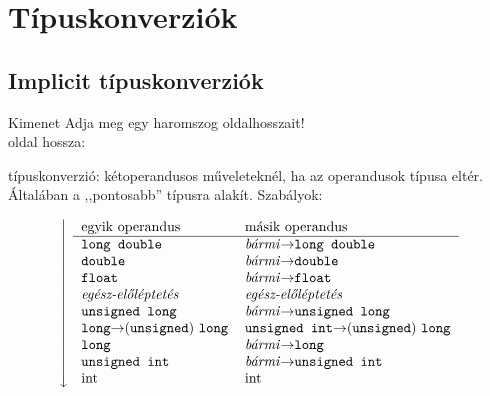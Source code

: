\documentclass[usenames,dvipsnames,aspectratio=169]{beamer}
\begin{document}
\begin{frame}
  \begin{exampleblock}{}
    \tiny
    
  \end{exampleblock}
\end{frame}

\section{Típuskonverziók}
\subsection{Implicit típuskonverziók}
\begin{frame}
  \begin{exampleblock}{}
    \small
    
  \end{exampleblock}
  \begin{block}{Kimenet}
Adja meg egy haromszog oldalhosszait!\\
 oldal hossza:
  \end{block}
\end{frame}

\begin{frame}
   típuskonverzió: kétoperandusos műveleteknél, ha az operandusok típusa eltér. Általában a ,,pontosabb''
típusra alakít. Szabályok:
  \begin{center}
    \[
      \left\downarrow\mbox{
      \begin{tabular}{ll}
        egyik operandus & másik operandus\\ \hline
        \texttt{long double} & \emph{bármi}$\to$\texttt{long double}\\
        \texttt{double} & \emph{bármi}$\to$\texttt{double}\\
        \texttt{float} & \emph{bármi}$\to$\texttt{float}\\
        \emph{egész-előléptetés} & \emph{egész-előléptetés}\\
        \texttt{unsigned long} & \emph{bármi}$\to$\texttt{unsigned long}\\
        \texttt{long}$\to$(\texttt{unsigned}) \texttt{long} & \texttt{unsigned int}$\to$(\texttt{unsigned})
        \texttt{long}\\
        \texttt{long} & \emph{bármi}$\to$\texttt{long}\\
        \texttt{unsigned int} & \emph{bármi}$\to$\texttt{unsigned int}\\
        int & int
      \end{tabular}}
      \right.
    \]
  \end{center}
\end{frame}
\end{document}
